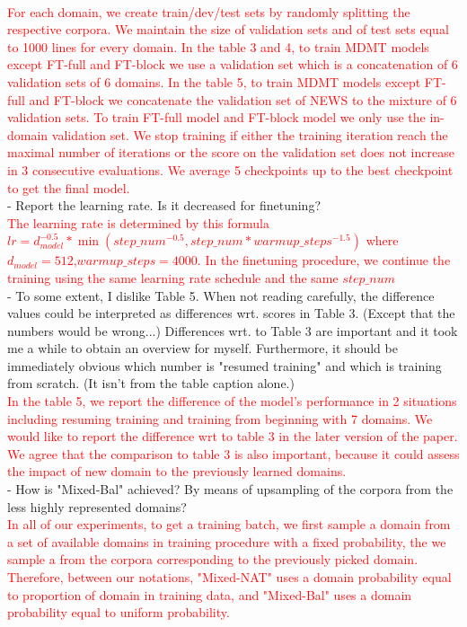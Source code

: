 \documentclass[12pt,times,a4paper,twoside]{article}
\theoremstyle{definition}
\begin{document}
\\
\textcolor{red}{For each domain, we create train/dev/test sets by randomly splitting the respective corpora. We maintain the size of validation sets and of test sets equal to 1000 lines for every domain. In the table 3 and 4, to train MDMT models except FT-full and FT-block we use a validation set which is a concatenation of 6 validation sets of 6 domains. In the table 5, to train MDMT models except FT-full and FT-block we concatenate the validation set of NEWS to the mixture of 6 validation sets. To train FT-full model and FT-block model we only use the in-domain validation set. We stop training if either the training iteration reach the maximal number of iterations or the score on the validation set does not increase in 3 consecutive evaluations. We average 5 checkpoints up to the best checkpoint to get the final model.}
\\
- Report the learning rate. Is it decreased for finetuning?
\\
\textcolor{red}{The learning rate is determined by this formula $lr = d_{model}^{-0.5}*\min(step\_num^{-0.5},step\_num * warmup\_steps^{-1.5})$ where $d_{model}=512$,$warmup\_steps=4000$. In the finetuning procedure, we continue the training using the same learning rate schedule and the same $step\_num$}
\\
- To some extent, I dislike Table 5. When not reading carefully, the
difference values could be interpreted as differences wrt. scores in Table 3. (Except that the numbers would be wrong...) Differences wrt. to Table 3 are important and it took me a while to obtain an overview for myself. Furthermore, it should be immediately obvious which number is "resumed training" and which is training from scratch. (It isn't from the table caption alone.)
\\
\textcolor{red}{In the table 5, we report the difference of the model's performance in 2 situations including resuming training and training from beginning with 7 domains. We would like to report the difference wrt to table 3 in the later version of the paper. We agree that the comparison to table 3 is also important, because it could assess the impact of new domain to the previously learned domains.}
\\
- How is "Mixed-Bal" achieved? By means of upsampling of the corpora from the less highly represented domains?
\\
\textcolor{red}{In all of our experiments, to get a training batch, we first sample a domain from a set of available domains in training procedure with a fixed probability, the we sample a from the corpora corresponding to the previously picked domain. Therefore, between our notations, "Mixed-NAT" uses a domain probability equal to proportion of domain in training data, and "Mixed-Bal" uses a domain probability equal to uniform probability.}
\end{document}

